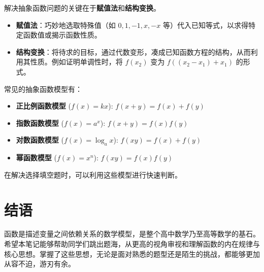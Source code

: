 \documentclass[a4paper,12pt]{ctexart}
\theoremstyle{mytheoremstyle}
\begin{document}
\begin{tcolorbox}[colback=purple!5!white, colframe=purple!75!black, title={\large \bfseries 抽象函数解题技巧}]
    解决抽象函数问题的关键在于\textbf{赋值法}和\textbf{结构变换}。
    \begin{itemize}
        \item \textbf{赋值法}：巧妙地选取特殊值（如 $0, 1, -1, x, -x$ 等）代入已知等式，以求得特定函数值或揭示函数性质。
        \item \textbf{结构变换}：将待求的目标，通过代数变形，凑成已知函数方程的结构，从而利用其性质。例如证明单调性时，将 $f(x_2)$ 变为 $f((x_2-x_1)+x_1)$ 的形式。
    \end{itemize}
    常见的抽象函数模型有：
    \begin{itemize}
        \item \textbf{正比例函数模型} ($f(x)=kx$): $f(x+y) = f(x)+f(y)$
        \item \textbf{指数函数模型} ($f(x)=a^x$): $f(x+y) = f(x)f(y)$
        \item \textbf{对数函数模型} ($f(x)=\log_a x$): $f(xy) = f(x)+f(y)$
        \item \textbf{幂函数模型} ($f(x)=x^n$): $f(xy) = f(x)f(y)$
    \end{itemize}
    在解决选择填空题时，可以利用这些模型进行快速判断。
\end{tcolorbox}

\section{结语}
函数是描述变量之间依赖关系的数学模型，是整个高中数学乃至高等数学的基石。希望本笔记能够帮助同学们跳出题海，从更高的视角审视和理解函数的内在规律与核心思想。掌握了这些思想，无论是面对熟悉的题型还是陌生的挑战，都能够更加从容不迫，游刃有余。
\end{document}
